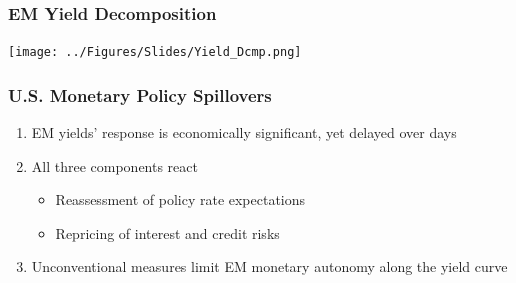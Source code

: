 \documentclass[12pt, aspectratio=169, xcolor=dvipsnames]{beamer}  %
\begin{document}

\begin{frame}
\frametitle{EM Yield Decomposition}
\begin{center}
	\texttt{[image: ../Figures/Slides/Yield\_Dcmp.png]}
\end{center}
\end{frame}

\begin{frame}
	\frametitle{U.S. Monetary Policy Spillovers}
	\begin{enumerate}
		\item EM yields' response is economically significant, yet delayed over days
		\item All three components react
		\begin{itemize}
			\item Reassessment of policy rate expectations
			\item Repricing of interest and credit risks
		\end{itemize} 
		\item Unconventional measures limit EM monetary autonomy along the yield curve
	\end{enumerate}
\end{frame}
\end{document}

